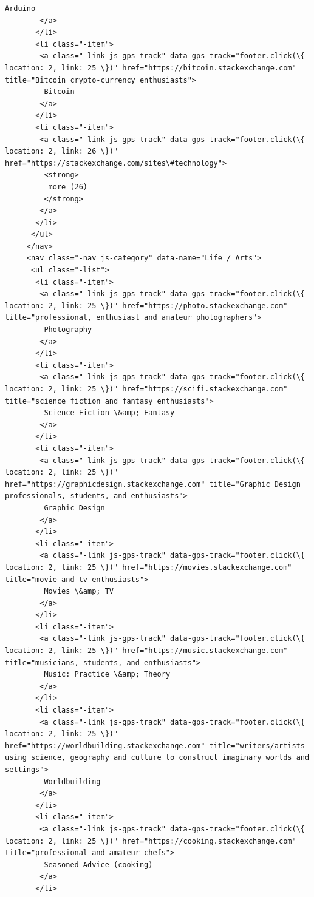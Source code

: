 \documentclass[11pt]{article}
\begin{document}
\begin{Verbatim}[commandchars=\\\{\}]
         Arduino
        </a>
       </li>
       <li class="-item">
        <a class="-link js-gps-track" data-gps-track="footer.click(\{ location: 2, link: 25 \})" href="https://bitcoin.stackexchange.com" title="Bitcoin crypto-currency enthusiasts">
         Bitcoin
        </a>
       </li>
       <li class="-item">
        <a class="-link js-gps-track" data-gps-track="footer.click(\{ location: 2, link: 26 \})" href="https://stackexchange.com/sites\#technology">
         <strong>
          more (26)
         </strong>
        </a>
       </li>
      </ul>
     </nav>
     <nav class="-nav js-category" data-name="Life / Arts">
      <ul class="-list">
       <li class="-item">
        <a class="-link js-gps-track" data-gps-track="footer.click(\{ location: 2, link: 25 \})" href="https://photo.stackexchange.com" title="professional, enthusiast and amateur photographers">
         Photography
        </a>
       </li>
       <li class="-item">
        <a class="-link js-gps-track" data-gps-track="footer.click(\{ location: 2, link: 25 \})" href="https://scifi.stackexchange.com" title="science fiction and fantasy enthusiasts">
         Science Fiction \&amp; Fantasy
        </a>
       </li>
       <li class="-item">
        <a class="-link js-gps-track" data-gps-track="footer.click(\{ location: 2, link: 25 \})" href="https://graphicdesign.stackexchange.com" title="Graphic Design professionals, students, and enthusiasts">
         Graphic Design
        </a>
       </li>
       <li class="-item">
        <a class="-link js-gps-track" data-gps-track="footer.click(\{ location: 2, link: 25 \})" href="https://movies.stackexchange.com" title="movie and tv enthusiasts">
         Movies \&amp; TV
        </a>
       </li>
       <li class="-item">
        <a class="-link js-gps-track" data-gps-track="footer.click(\{ location: 2, link: 25 \})" href="https://music.stackexchange.com" title="musicians, students, and enthusiasts">
         Music: Practice \&amp; Theory
        </a>
       </li>
       <li class="-item">
        <a class="-link js-gps-track" data-gps-track="footer.click(\{ location: 2, link: 25 \})" href="https://worldbuilding.stackexchange.com" title="writers/artists using science, geography and culture to construct imaginary worlds and settings">
         Worldbuilding
        </a>
       </li>
       <li class="-item">
        <a class="-link js-gps-track" data-gps-track="footer.click(\{ location: 2, link: 25 \})" href="https://cooking.stackexchange.com" title="professional and amateur chefs">
         Seasoned Advice (cooking)
        </a>
       </li>

\end{Verbatim}
\end{document}
